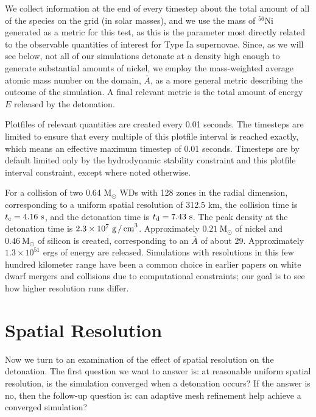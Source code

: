 \documentclass[twocolumn,numberedappendix]{../aastex62}
\newcommand{\msolar}{\mathrm{M}_\odot}
\begin{document}
We collect information at the end of every timestep about the total amount of
all of the species on the grid (in solar masses), and we use the mass of $^{56}$Ni
generated as a metric for this test, as this is the parameter most directly related
to the observable quantities of interest for Type Ia supernovae. Since, as we will see
below, not all of our simulations detonate at a density high enough to generate substantial
amounts of nickel, we employ the mass-weighted average atomic mass number on the domain,
$\bar{A}$, as a more general metric describing the outcome of the simulation. A
final relevant metric is the total amount of energy $E$ released by the detonation.

Plotfiles of relevant quantities are created every 0.01 seconds.
The timesteps are limited to ensure that every multiple of this plotfile interval is
reached exactly, which means an effective maximum timestep of 0.01 seconds. Timesteps
are by default limited only by the hydrodynamic stability constraint and this plotfile
interval constraint, except where noted otherwise.

For a collision of two 0.64 $\msolar$ WDs with 128 zones in the radial dimension,
corresponding to a uniform spatial resolution of 312.5 km, the collision time is
$t_{\rm c} = 4.16\ \text{s}$, and the detonation time is $t_{\rm d} = 7.43\ \text{s}$.
The peak density at the detonation time is $2.3 \times 10^7\ \text{g\,/\,cm}^3$.
Approximately $0.21\ \msolar$ of nickel and $0.46\ \msolar$ of silicon is created,
corresponding to an $\bar{A}$ of about 29. Approximately $1.3 \times 10^{51}$
ergs of energy are released. Simulations with resolutions in this few hundred kilometer
range have been a common choice in earlier papers on white dwarf mergers and collisions
due to computational constraints; our goal is to see how higher resolution runs differ.



\section{Spatial Resolution}
\label{sec:spatialresolution}

Now we turn to an examination of the effect of spatial resolution on the detonation.
The first question we want to answer is: at reasonable uniform spatial resolution, is
the simulation converged when a detonation occurs? If the answer is no, then the
follow-up question is: can adaptive mesh refinement help achieve a converged simulation?
\end{document}
